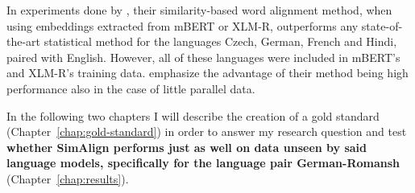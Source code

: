 
In experiments done by \textcite{jalili-sabet-etal-2020-simalign}, their similarity-based word alignment method, when using embeddings extracted from mBERT or XLM-R, outperforms any state-of-the-art statistical method for the languages Czech, German, French and Hindi, paired with English. 
However, all of these languages were included in mBERT's and XLM-R's training data. 
\textcite{jalili-sabet-etal-2020-simalign} emphasize the advantage of their method being high performance also in the case of little  parallel data.

In the following two chapters I will describe the creation of a gold standard (Chapter~\ref{chap:gold-standard}) in order to answer my research question and test \textbf{whether SimAlign performs just as well on data unseen by said language models, specifically for the language pair German-Romansh} (Chapter~\ref{chap:results}).




